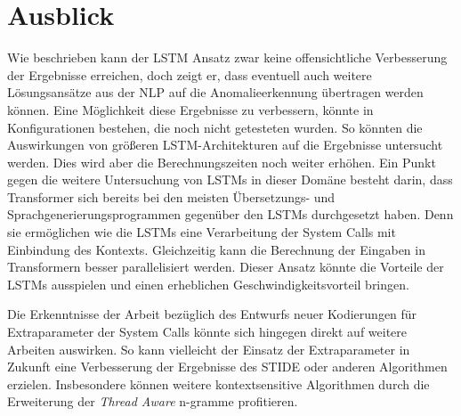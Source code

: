 \section{Ausblick}
Wie beschrieben kann der \ac{LSTM} Ansatz zwar keine offensichtliche Verbesserung der Ergebnisse erreichen, doch zeigt er, dass eventuell auch weitere Lösungsansätze aus der \ac{NLP} auf die Anomalieerkennung übertragen werden können.
Eine Möglichkeit diese Ergebnisse zu verbessern, könnte in Konfigurationen bestehen, die noch nicht getesteten wurden.
So könnten die Auswirkungen von größeren \ac{LSTM}-Architekturen auf die Ergebnisse untersucht werden.
Dies wird aber die Berechnungszeiten noch weiter erhöhen.
Ein Punkt gegen die weitere Untersuchung von \acp{LSTM} in dieser Domäne besteht darin, dass Transformer sich bereits bei den meisten Übersetzungs-  und Sprachgenerierungsprogrammen  gegenüber den \acp{LSTM} durchgesetzt haben. 
Denn sie ermöglichen wie die \acp{LSTM} eine Verarbeitung der System Calls mit Einbindung des Kontexts.
Gleichzeitig kann die Berechnung der Eingaben in Transformern besser parallelisiert werden.
Dieser Ansatz könnte die Vorteile der \acp{LSTM} ausspielen und einen erheblichen Geschwindigkeitsvorteil bringen.

Die Erkenntnisse der Arbeit bezüglich des Entwurfs neuer Kodierungen für Extraparameter der System Calls könnte sich hingegen direkt auf weitere Arbeiten auswirken.
So kann vielleicht der Einsatz der Extraparameter in Zukunft eine Verbesserung der Ergebnisse des \ac{STIDE} oder anderen Algorithmen erzielen.
Insbesondere können weitere kontextsensitive Algorithmen durch die Erweiterung der \textit{Thread Aware} n-gramme profitieren. 
